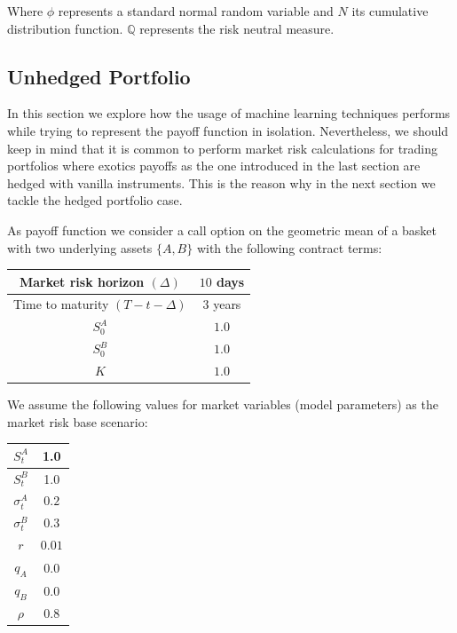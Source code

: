
Where $\phi$ represents a standard normal random variable and $N$ its cumulative distribution function. $\mathbb{Q}$ represents the risk neutral measure.


\subsection{Unhedged Portfolio}
 In this section we explore how the usage of machine learning techniques performs while trying to represent the payoff function in isolation. Nevertheless, we should keep in mind that it is common to perform market risk calculations for trading portfolios where exotics payoffs as the one introduced in the last section are hedged with vanilla instruments. This is the reason why in the next section we tackle the hedged portfolio case. 
 
 As payoff function we consider a call option on the geometric mean of a basket with two underlying assets $\{A,B\}$ with the following contract terms:
 
 
\begin{center}
\begin{tabular}{||c | c||} 
 \hline
 Market risk horizon $(\Delta)$ & $10$ days \\ 
 \hline
 Time to maturity $(T-t-\Delta)$ & $3$ years \\
 \hline
 $S_0^A$ & $1.0$ \\
 \hline
 $S_0^B$ & $1.0$ \\
 \hline
 $K$ & $1.0$ \\
 \hline
 \end{tabular}
\end{center}

We assume the following values for market variables (model parameters) as the market risk base scenario:

\begin{center}
\begin{tabular}{||c | c||} 
 \hline
 $S_t^A$ & 1.0 \\
 \hline
 $S_t^B$ & 1.0 \\
 \hline
 $\sigma_t^A$ & $0.2$ \\
 \hline
 $\sigma_t^B$ & $0.3$ \\
 \hline
 $r$ & $0.01$ \\
 \hline
 $q_A$ & $0.0$ \\
 \hline
 $q_B$ & $0.0$ \\
 \hline
 $\rho$ & $0.8$ \\
 \hline
\end{tabular}
\end{center}

